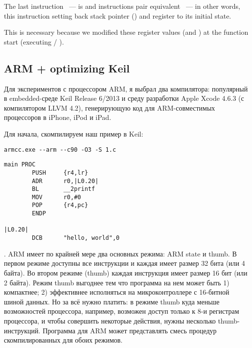 

{The last instruction \LEAVE ~--- is  and  instructions pair equivalent ~--- 
in other words, this instruction setting back stack pointer (\ESP) and \EBP register to its initial state.} 

{This is necessary because we modified these register values (\ESP and \EBP) at the function start (executing}
 / ).

\subsection{ARM + optimizing Keil}

Для экспериментов с процессором ARM, я выбрал два компилятора: популярный в embedded-среде Keil Release 6/2013 и среду разработки Apple Xcode 4.6.3 (с компилятором LLVM 4.2), генерирующую код для ARM-совместимых процессоров в iPhone, iPod и iPad.

Для начала, скомпилируем наш пример в Keil:

\begin{lstlisting}
armcc.exe --arm --c90 -O3 -S 1.c 
\end{lstlisting}

\begin{lstlisting}
main PROC
        PUSH     {r4,lr}
        ADR      r0,|L0.20|
        BL       __2printf
        MOV      r0,#0
        POP      {r4,pc}
        ENDP

|L0.20|
        DCB      "hello, world",0
\end{lstlisting}

.
ARM имеет по крайней мере два основных режима: ARM state и thumb. 
В первом режиме доступны все инструкции и каждая имеет размер 32 бита (или 4 байта). 
Во втором режиме (thumb) каждая инструкция имеет размер 16 бит (или 2 байта). Режим thumb выгоднее тем что программа
на нем может быть 1) компактнее; 2) эффективнее исполняться на микроконтроллере с 16-битной шиной данных. Но за всё
нужно платить: в режиме thumb куда меньше возможностей процессора, например, возможен доступ только к 8-и регистрам
процессора, и чтобы совершить некоторые действия, нужны несколько thumb-инструкций.
Программа для ARM может представлять смесь процедур скомпилированных для обоих режимов.

